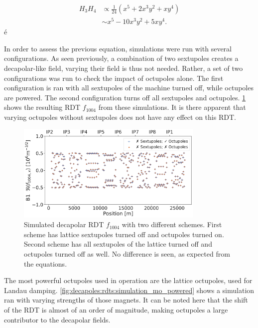 \begin{equation}
    \begin{aligned}
         H_3 H_4 &\propto \frac{1}{24} \left(x^5 + 2x^3y^2 + xy^4 \right)\\
                   &\sim    x^5 - 10x^3y^2 + 5xy^4.
    \end{aligned}
    \label{eq:decapoles:sextupole_octupole_b5}
\end{equation}é

In order to assess the previous equation, simulations were run with several configurations.
As seen previously, a combination of two sextupoles creates a decapolar-like field, varying their 
field is thus not needed. Rather, a set of two configurations was run to check the impact of 
octupoles alone. The first configuration is ran with all sextupoles of the machine
turned off, while octupoles are powered. The second configuration turns off all sextupoles and
octupoles. \cref{fig:decapoles:rdts:sectupole_octupole_no_diff} shows the resulting RDT $f_{1004}$
from these simulations. It is there apparent that varying octupoles without sextupoles does not have 
any effect on this RDT.

\begin{figure}[!htb]
    \centering
    \includegraphics[width=0.8\textwidth]{./images/f1004/f1004_no_ms.pdf}
    \caption{Simulated decapolar RDT $f_{1004}$ with two different schemes. First scheme has
    lattice sextupoles turned off and octupoles turned on. Second scheme has all sextupoles of the
    lattice turned off and octupoles turned off as well. No difference is seen, as expected from
    the equations.}
    \label{fig:decapoles:rdts:sectupole_octupole_no_diff}
\end{figure}

The most powerful octupoles used in operation are the lattice octupoles, used for Landau damping.
\cref{fig:decapoles:rdts:simulation_mo_powered} shows a simulation ran with varying strengths of
those magnets. It can be noted here that the shift of the RDT is almost of an order of magnitude,
making octupoles a large contributor to the decapolar fields.

